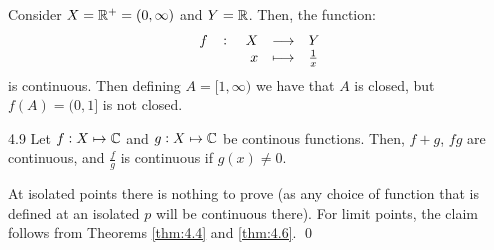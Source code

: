 \begin{nexample}{}{}
    Consider $X = \mathbb{R}^+ = (0, \infty)$ and $Y = \mathbb{R}$. Then, the function:
    \begin{align*}
        \fullfunction{f}{X}{Y}{x}{\frac{1}{x}}
    \end{align*}
    is continuous. Then defining $A = [1, \infty)$ we have that $A$ is closed, but $f(A) = (0, 1]$ is not closed.   
\end{nexample}


\begin{theorem}{}{4.9}
    Let $f: X \mapsto \mathbb{C}$ and $g: X \mapsto \mathbb{C}$ be continous functions. Then, $f+g$, $fg$ are continuous, and $\frac{f}{g}$ is continuous if $g(x) \neq 0$. 
\end{theorem}
\begin{nproof}
    At isolated points there is nothing to prove (as any choice of function that is defined at an isolated $p$ will be continuous there). For limit points, the claim follows from Theorems \ref{thm:4.4} and \ref{thm:4.6}. \qed
\end{nproof}

